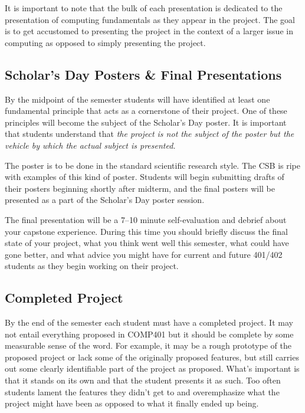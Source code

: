 \documentclass[nobib]{tufte-handout}
\begin{document}
It is important to note that the bulk of each presentation is dedicated to the presentation of computing fundamentals as they appear in the project. The goal is to get accustomed to presenting the project in the context of a larger issue in computing as opposed to simply presenting the project.

\subsection{Scholar's Day Posters \& Final Presentations}

By the midpoint of the semester students will have identified at least one fundamental principle that acts as a cornerstone of their project. One of these principles will become the subject of the Scholar's Day poster.  It is important that students understand that \textit{the project is not the subject of the poster but the vehicle by which the actual subject is presented.}

The poster is to be done in the standard scientific research style. The CSB is ripe with examples of this kind of poster. Students will begin submitting drafts of their posters beginning shortly after midterm, and the final posters will be presented as a part of the Scholar's Day poster session.

The final presentation will be a 7--10 minute self-evaluation and debrief about your capstone experience. During this time you should briefly discuss the final state of your project, what you think went well this semester, what could have gone better, and what advice you might have for current and future 401/402 students as they begin working on their project.

\subsection{Completed Project}

By the end of the semester each student must have a completed project. It may not entail everything proposed in COMP401 but it should be complete by some measurable sense of the word. For example, it may be a rough prototype of the proposed project or lack some of the originally proposed features, but still carries out some clearly identifiable part of the project as proposed. What's important is that it stands on its own and that the student presents it as such. Too often students lament the features they didn't get to and overemphasize what the project might have been as opposed to what it finally ended up being.
\end{document}
